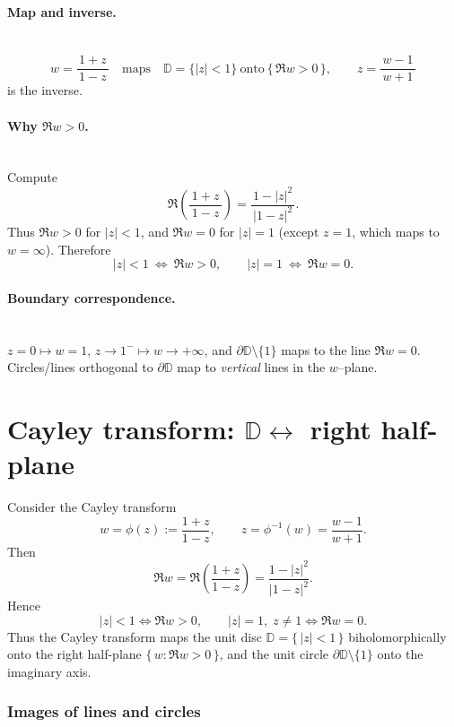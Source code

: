 \documentclass[12pt,a4paper]{article}
\begin{document}
	\paragraph{Map and inverse.}\mbox{}\\[2pt]
	\[
	w=\frac{1+z}{\,1-z\,}
	\quad\text{maps}\quad
	\mathbb D=\{|z|<1\}\ \text{onto}\ \{\,\Re w>0\,\},
	\qquad
	z=\frac{w-1}{\,w+1\,}
	\]
	is the inverse.
	
	\medskip
	
	\paragraph{Why $\Re w>0$.}\mbox{}\\[2pt]
	Compute
	\[
	\Re\!\left(\frac{1+z}{\,1-z\,}\right)
	=\frac{\,1-|z|^{2}\,}{\,|1-z|^{2}\,}.
	\]
	Thus $\Re w>0$ for $|z|<1$, and $\Re w=0$ for $|z|=1$ (except $z=1$, which maps to $w=\infty$).
	Therefore
	\[
	|z|<1\ \Longleftrightarrow\ \Re w>0,
	\qquad
	|z|=1\ \Longleftrightarrow\ \Re w=0 .
	\]
	
	\medskip
	
	\paragraph{Boundary correspondence.}\mbox{}\\[2pt]
	$z=0\mapsto w=1$,
	\quad
	$z\to1^{-}\mapsto w\to+\infty$,
	\quad
	and $\partial\mathbb D\setminus\{1\}$ maps to the line $\Re w=0$.\\[2pt]
	Circles/lines orthogonal to $\partial\mathbb D$ map to \emph{vertical} lines in the $w$–plane.
	
	
	\section*{Cayley transform: \(\mathbb D \leftrightarrow\) right half-plane}
	
	Consider the Cayley transform
	\[
	w = \phi(z) := \frac{1+z}{1-z}, 
	\qquad
	z = \phi^{-1}(w) = \frac{w-1}{w+1}.
	\]
	Then
	\[
	\Re w 
	= \Re\!\left(\frac{1+z}{1-z}\right)
	= \frac{1-|z|^2}{|1-z|^2}.
	\]
	Hence
	\[
	|z| < 1 \iff \Re w > 0,
	\qquad
	|z| = 1,\; z\neq 1 \iff \Re w = 0.
	\]
	Thus the Cayley transform maps the unit disc
	\(\mathbb D = \{\,|z|<1\,\}\) biholomorphically onto the right
	half-plane \(\{\,w : \Re w>0\,\}\), and the unit circle
	\(\partial\mathbb D \setminus \{1\}\) onto the imaginary axis.
	
	\subsubsection*{Images of lines and circles}
	
\end{document}

